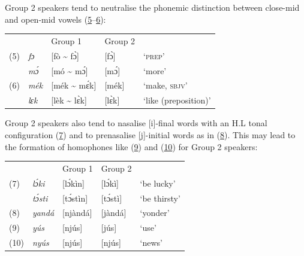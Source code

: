 \bigskip
Group 2 speakers tend to neutralise the phonemic distinction between close-mid and open-mid vowels (\hyperref[ex:0.5]{5}–\hyperref[ex:0.6]{6}):

\bigskip
\noindent\begin{tabularx}{\textwidth}{l lX lX}
 &  & Group 1 & Group 2 & \\
(5) \label{ex:0.5}
         & \itshape fɔ & [fò {\textasciitilde} fɔ̀] & [fɔ̀] & ‘\textsc{prep}’\\
& \itshape mɔ́ & [mó {\textasciitilde} mɔ́] & [mɔ́] & ‘more’\\
(6) \label{ex:0.6}
         & \itshape mék & [mék {\textasciitilde} mɛ́k] & [mék] & ‘make, \textsc{sbjv}’\\
& \itshape lɛk & [lèk {\textasciitilde} lɛ̀k] & [lɛ̀k] & ‘like (preposition)’\\
\end{tabularx}

\bigskip
Group 2 speakers also tend to nasalise [i]-final words with an H.L tonal configuration (\hyperref[ex:0.7]{7}) and to prenasalise [j]-initial words as in (\hyperref[ex:0.8]{8}). This may lead to the formation of homophones like (\hyperref[ex:0.9]{9}) and (\hyperref[ex:0.10]{10}) for Group 2 speakers:

\bigskip
\noindent\begin{tabularx}{\textwidth}{l ll lX}
 &  & Group 1 & Group 2 & \\
(7) \label{ex:0.7}
         & \itshape lɔ́ki & [lɔ́kìn] & [lɔ́kì] & ‘be lucky’\\
& \itshape tɔ́sti & [tɔ́stìn] & [tɔ́stì] & ‘be thirsty’\\
(8) \label{ex:0.8}
         & \itshape yandá & [njàndá] & [jàndá] & ‘yonder’\\
(9) \label{ex:0.9}
         & \itshape yús & [njús] & [jús] & ‘use’\\
(10) \label{ex:0.10}
         & \itshape nyús & [njús] & [njús] & ‘news’\\
\end{tabularx}



\addtocounter{equation}{10}

